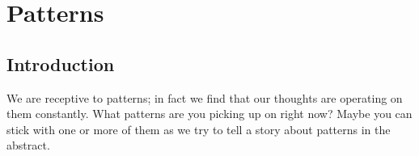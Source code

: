 \documentclass[DynamicalBook]{subfiles}
\begin{document}
%


\setcounter{chapter}{4}%


\tableofcontents*

\chapter{Patterns}\label{chapter.5}

\section{Introduction}\label{sec.c5_intro}


We are receptive to patterns; in fact we find that our thoughts are operating on them constantly. What patterns are you picking up on right now? Maybe you can stick with one or more of them as we try to tell a story about patterns in the abstract.
\end{document}
